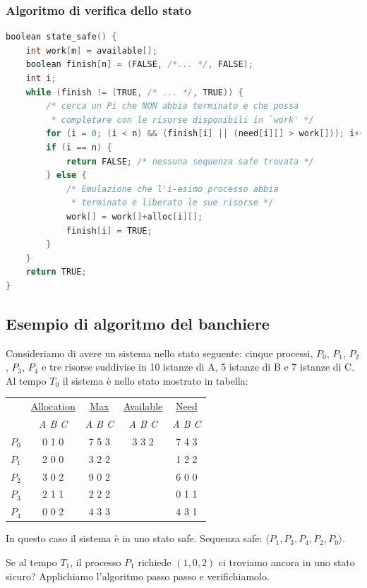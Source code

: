 \documentclass[a4paper,12pt, twoside]{report}
\begin{document}
\subsubsection{Algoritmo di verifica dello stato}
\begin{lstlisting}[language=C]
boolean state_safe() {
	int work[m] = available[];
	boolean finish[n] = (FALSE, /*... */, FALSE);
	int i;
	while (finish != (TRUE, /* ... */, TRUE)) {
		/* cerca un Pi che NON abbia terminato e che possa
		 * completare con le risorse disponibili in `work' */
		for (i = 0; (i < n) && (finish[i] || (need[i][] > work[])); i++);
		if (i == n) {
			return FALSE; /* nessuna sequenza safe trovata */
		} else {
			/* Emulazione che l'i-esimo processo abbia 
			 * terminato e liberato le sue risorse */
			work[] = work[]+alloc[i][];
			finish[i] = TRUE;
		}
	}
	return TRUE;
} 

\end{lstlisting}


\subsection{Esempio di algoritmo del banchiere}
Consideriamo di avere un sistema nello stato seguente: cinque processi, $P_0$, $P_1$, $P_2$, $P_3$, $P_4$ e tre risorse suddivise in 10 istanze di A, 5 istanze di B e 7 istanze di C.
Al tempo $T_0$ il sistema \`e nello stato mostrato in tabella:
\begin{center}
\begin{tabular}{c | c  | c | c | c }
 & \underline{Allocation} & \underline{Max} & \underline{Available} & \underline{Need} \\
 & \emph{A B C} & \emph{A B C} & \emph{A B C} & \emph{A B C} \\
 $P_0$ & 0 1 0 & 7 5 3 & 3 3 2 & 7 4 3 \\
 $P_1$ & 2 0 0 & 3 2 2 & & 1 2 2 \\
 $P_2$ & 3 0 2 & 9 0 2 & & 6 0 0 \\
 $P_3$ & 2 1 1 & 2 2 2 & & 0 1 1 \\
 $P_4$ & 0 0 2 & 4 3 3 & & 4 3 1 \\
 \end{tabular}
 \end{center}
In questo caso il sistema \`e in uno stato safe. Sequenza safe: $\langle P_1, P_3, P_4, P_2, P_0 \rangle$.

Se al tempo $T_1$, il processo $P_1$ richiede $(1,0,2)$ ci troviamo ancora in uno stato sicuro?
Applichiamo l'algoritmo passo passo e verifichiamolo. 
\end{document}
